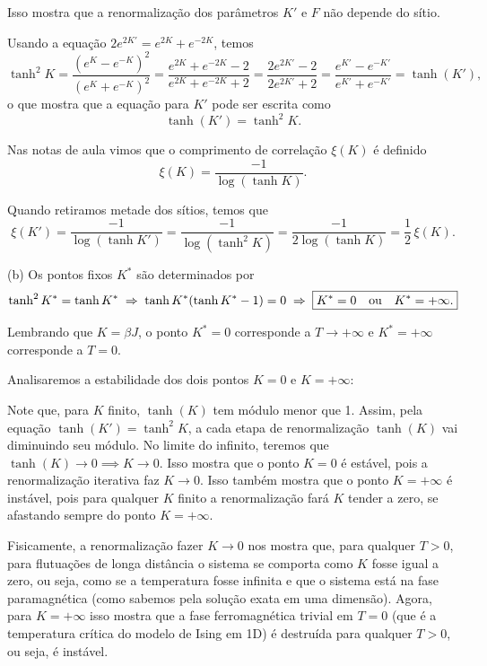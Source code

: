 \documentclass[a4paper,10pt]{article}
\begin{document}
Isso mostra que a renormalização dos parâmetros $K'$ e $F$ não depende do sítio.

\n\n

Usando a equação $2 e^{2K'} = e^{2K} + e^{-2K}$, temos
$$
\tanh^2 K = \frac{(e^K - e^{-K})^2}{(e^K + e^{-K})^2} = \frac{e^{2K} + e^{-2K} - 2}{e^{2K} + e^{-2K} + 2} =
\frac{2e^{2K'} - 2}{2e^{2K'} + 2} = \frac{e^{K'} - e^{-K'}}{e^{K'} + e^{-K'}} = \tanh(K'),
$$
o que mostra que a equação para $K'$ pode ser escrita como
$$
\boxed{ \tanh(K') = \tanh^2 K. }
$$

\n

Nas notas de aula vimos que o comprimento de correlação $\xi(K)$ é definido
$$
\xi(K) = \frac{-1}{\log(\tanh K)}.
$$

\n

Quando retiramos metade dos sítios, temos que
$$
\xi(K') = \frac{-1}{\log(\tanh K')} = \frac{-1}{\log(\tanh^2 K)} = \frac{-1}{2 \log(\tanh K)} = \frac{1}{2} \, \xi(K).
$$

\n\n

(b) Os pontos fixos $K^*$ são determinados por
$$
\tanh^2 K^* = \tanh K^* \; \Rightarrow \; \tanh K^* (\tanh K^* - 1) = 0 \; \Rightarrow \; \boxed{ K^* = 0 \quad \mathrm{ou} \quad K^* = +\infty.}
$$

\n

Lembrando que $K = \beta J$, o ponto $K^* = 0$ corresponde a $T \to +\infty$ e $K^* = +\infty$ corresponde a $T = 0$.

\n

Analisaremos a estabilidade dos dois pontos $K = 0$ e $K = +\infty$:

\n

Note que, para $K$ finito, $\tanh(K)$ tem módulo menor que 1. Assim, pela equação $\tanh(K') = \tanh^2 K$, a cada etapa de renormalização $\tanh(K)$ vai diminuindo seu módulo. No limite do infinito, teremos que $\tanh(K) \to 0 \implies K \to 0$. Isso mostra que o ponto $K = 0$ é estável, pois a renormalização iterativa faz $K \to 0$. Isso também mostra que o ponto $K = +\infty$ é instável, pois para qualquer $K$ finito a renormalização fará $K$ tender a zero, se afastando sempre do ponto $K = +\infty$.

\n

Fisicamente, a renormalização fazer $K \to 0$ nos mostra que, para qualquer $T > 0$, para flutuações de longa distância o sistema se comporta como $K$ fosse igual a zero, ou seja, como se a temperatura fosse infinita e que o sistema está na fase paramagnética (como sabemos pela solução exata em uma dimensão). Agora, para $K = +\infty$ isso mostra que a fase ferromagnética trivial em $T = 0$ (que é a temperatura crítica do modelo de Ising em 1D) é destruída para qualquer $T > 0$, ou seja, é instável.
\end{document}

